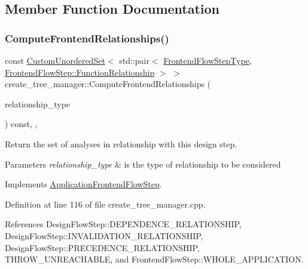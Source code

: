 \subsection{Member Function Documentation}
\mbox{\label{classcreate__tree__manager_a55f84a3d6df3e766409a9c5a0936b6b6}} 
\subsubsection{\texorpdfstring{Compute\+Frontend\+Relationships()}{ComputeFrontendRelationships()}}
{\footnotesize\ttfamily const \hyperlink{classCustomUnorderedSet}{Custom\+Unordered\+Set}$<$ std\+::pair$<$ \hyperlink{frontend__flow__step_8hpp_afeb3716c693d2b2e4ed3e6d04c3b63bb}{Frontend\+Flow\+Step\+Type}, \hyperlink{classFrontendFlowStep_af7cf30f2023e5b99e637dc2058289ab0}{Frontend\+Flow\+Step\+::\+Function\+Relationship} $>$ $>$ create\+\_\+tree\+\_\+manager\+::\+Compute\+Frontend\+Relationships (\begin{DoxyParamCaption}\item[{const \hyperlink{classDesignFlowStep_a723a3baf19ff2ceb77bc13e099d0b1b7}{Design\+Flow\+Step\+::\+Relationship\+Type}}]{relationship\+\_\+type }\end{DoxyParamCaption}) const\hspace{0.3cm}{\ttfamily [override]}, {\ttfamily [private]}, {\ttfamily [virtual]}}



Return the set of analyses in relationship with this design step. 


\begin{DoxyParams}{Parameters}
{\em relationship\+\_\+type} & is the type of relationship to be considered \\
\hline
\end{DoxyParams}


Implements \hyperlink{classApplicationFrontendFlowStep_ab308200c0096ccff3a1ff50e864ed61f}{Application\+Frontend\+Flow\+Step}.



Definition at line 116 of file create\+\_\+tree\+\_\+manager.\+cpp.



References Design\+Flow\+Step\+::\+D\+E\+P\+E\+N\+D\+E\+N\+C\+E\+\_\+\+R\+E\+L\+A\+T\+I\+O\+N\+S\+H\+IP, Design\+Flow\+Step\+::\+I\+N\+V\+A\+L\+I\+D\+A\+T\+I\+O\+N\+\_\+\+R\+E\+L\+A\+T\+I\+O\+N\+S\+H\+IP, Design\+Flow\+Step\+::\+P\+R\+E\+C\+E\+D\+E\+N\+C\+E\+\_\+\+R\+E\+L\+A\+T\+I\+O\+N\+S\+H\+IP, T\+H\+R\+O\+W\+\_\+\+U\+N\+R\+E\+A\+C\+H\+A\+B\+LE, and Frontend\+Flow\+Step\+::\+W\+H\+O\+L\+E\+\_\+\+A\+P\+P\+L\+I\+C\+A\+T\+I\+ON.

